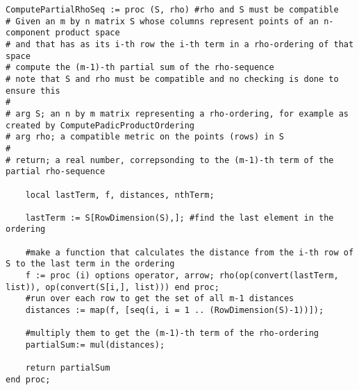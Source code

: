 \newpage



\newpage
\begin{lstlisting}
ComputePartialRhoSeq := proc (S, rho) #rho and S must be compatible
# Given an m by n matrix S whose columns represent points of an n-component product space
# and that has as its i-th row the i-th term in a rho-ordering of that space
# compute the (m-1)-th partial sum of the rho-sequence 
# note that S and rho must be compatible and no checking is done to ensure this	
#
# arg S; an n by m matrix representing a rho-ordering, for example as created by ComputePadicProductOrdering
# arg rho; a compatible metric on the points (rows) in S
#
# return; a real number, correpsonding to the (m-1)-th term of the partial rho-sequence

	local lastTerm, f, distances, nthTerm;

	lastTerm := S[RowDimension(S),]; #find the last element in the ordering 

	#make a function that calculates the distance from the i-th row of S to the last term in the ordering
	f := proc (i) options operator, arrow; rho(op(convert(lastTerm, list)), op(convert(S[i,], list))) end proc; 
	#run over each row to get the set of all m-1 distances
	distances := map(f, [seq(i, i = 1 .. (RowDimension(S)-1))]);

	#multiply them to get the (m-1)-th term of the rho-ordering
	partialSum:= mul(distances);

	return partialSum
end proc;
\end{lstlisting}

